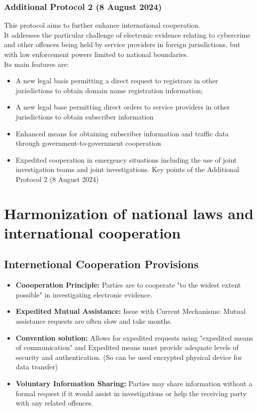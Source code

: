 \subsubsection{Additional Protocol 2 (8 August 2024)}
This protocol aims to further enhance international cooperation.\\
It addresses the particular challenge of electronic evidence relating to
cybercrime and other offences being held by service providers in
foreign jurisdictions, but with law enforcement powers limited to
national boundaries.\\
Its main features are:
\begin{itemize}[itemsep=0pt]
  \item A new legal basis permitting a direct request to registrars in other jurisdictions to obtain domain name registration information;
  \item A new legal base permitting direct orders to service providers in other jurisdictions to obtain subscriber information
  \item Enhanced means for obtaining subscriber information and traffic data through government-to-government cooperation
  \item Expedited cooperation in emergency situations including the use of joint investigation teams and joint investigations. Key points of the Additional Protocol 2 (8 August 2024)
\end{itemize}

\section{Harmonization of national laws and international cooperation}

\subsection{Internetional Cooperation Provisions}
\begin{itemize}[itemsep=0pt]
  \item \textbf{Coooperation Principle:} Parties are to cooperate "to the widest extent possible" in investigating electronic evidence.
  \item \textbf{Expedited Mutual Assistance:} Issue with Current Mechanisms: Mutual assistance requests are often slow and take months.
  \item \textbf{Convention solution:} Allows for expedited requests using "expedited means of communication" and Expedited means must provide adequate levels of security and authentication. (So can be used encrypted physical device for data transfer)
  \item \textbf{Voluntary Information Sharing:} Parties may share information without a formal request if it would assist in investigations or help the receiving party with any related offences.
\end{itemize}

